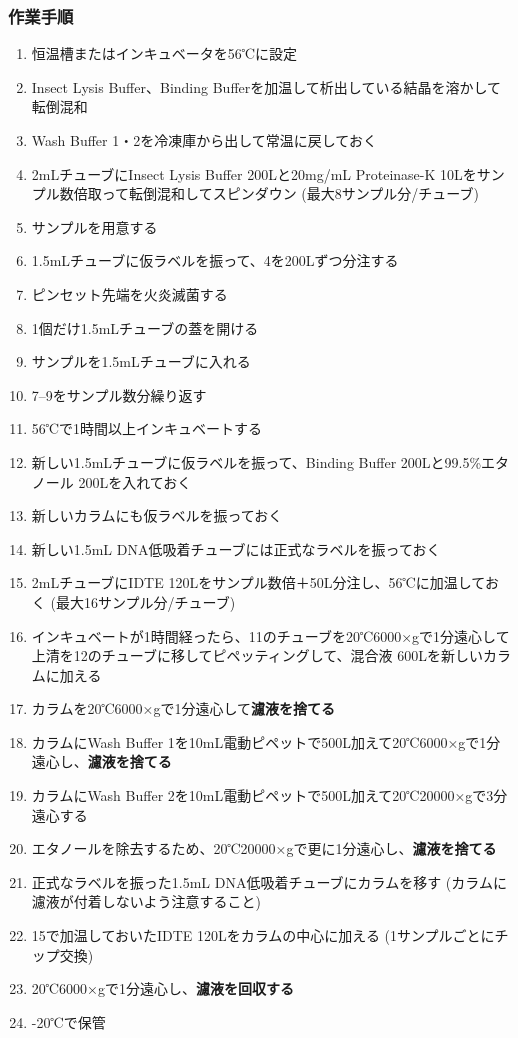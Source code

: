 \documentclass[titlepage,10pt,a4paper]{jsbook}
\begin{document}
\subsubsection{作業手順}
\begin{enumerate}
\item 恒温槽またはインキュベータを56℃に設定
\item Insect Lysis Buffer、Binding Bufferを加温して析出している結晶を溶かして転倒混和
\item Wash Buffer 1・2を冷凍庫から出して常温に戻しておく
\item 2mLチューブにInsect Lysis Buffer 200{\textmu}Lと20mg/mL Proteinase-K 10{\textmu}Lをサンプル数倍取って転倒混和してスピンダウン (最大8サンプル分/チューブ)
\item サンプルを用意する
\item 1.5mLチューブに仮ラベルを振って、4を200{\textmu}Lずつ分注する
\item ピンセット先端を火炎滅菌する
\item 1個だけ1.5mLチューブの蓋を開ける
\item サンプルを1.5mLチューブに入れる
\item 7--9をサンプル数分繰り返す
\item 56℃で1時間以上インキュベートする
\item 新しい1.5mLチューブに仮ラベルを振って、Binding Buffer 200{\textmu}Lと99.5\%エタノール 200{\textmu}Lを入れておく
\item 新しいカラムにも仮ラベルを振っておく
\item 新しい1.5mL DNA低吸着チューブには正式なラベルを振っておく
\item 2mLチューブにIDTE 120{\textmu}Lをサンプル数倍＋50{\textmu}L分注し、56℃に加温しておく (最大16サンプル分/チューブ)
\item インキュベートが1時間経ったら、11のチューブを20℃6000×gで1分遠心して上清を12のチューブに移してピペッティングして、混合液 600{\textmu}Lを新しいカラムに加える
\item カラムを20℃6000×gで1分遠心して\textbf{濾液を捨てる}
\item カラムにWash Buffer 1を10mL電動ピペットで500{\textmu}L加えて20℃6000×gで1分遠心し、\textbf{濾液を捨てる}
\item カラムにWash Buffer 2を10mL電動ピペットで500{\textmu}L加えて20℃20000×gで3分遠心する
\item エタノールを除去するため、20℃20000×gで更に1分遠心し、\textbf{濾液を捨てる}
\item 正式なラベルを振った1.5mL DNA低吸着チューブにカラムを移す (カラムに濾液が付着しないよう注意すること)
\item 15で加温しておいたIDTE 120{\textmu}Lをカラムの中心に加える (1サンプルごとにチップ交換)
\item 20℃6000×gで1分遠心し、\textbf{濾液を回収する}
\item -20℃で保管
\end{enumerate}
\end{document}
